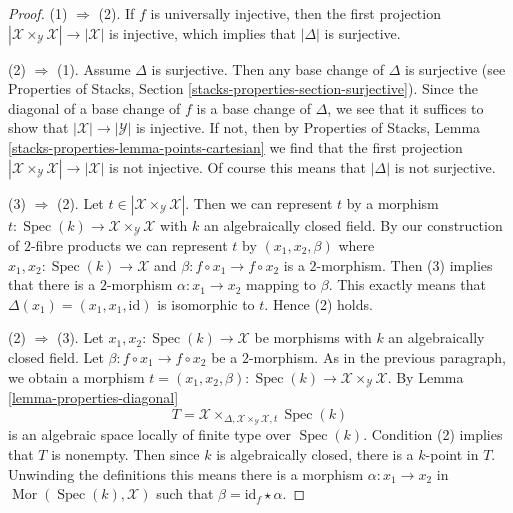 \documentclass[10pt,a4paper]{amsart}
\theoremstyle{plain}
\theoremstyle{definition}
\theoremstyle{remark}
\numberwithin{equation}{subsection}
\def\Spec{\mathop{\mathrm{Spec}}}
\def\Mor{\mathop{\mathrm{Mor}}\nolimits}
\begin{document}
\begin{proof}
(1) $\Rightarrow$ (2). If $f$ is universally injective, then the
first projection
$|\mathcal{X} \times_\mathcal{Y} \mathcal{X}| \to |\mathcal{X}|$
is injective, which implies that $|\Delta|$ is surjective.

\medskip\noindent
(2) $\Rightarrow$ (1). Assume $\Delta$ is surjective. Then any base change
of $\Delta$ is surjective (see Properties of Stacks, Section
\ref{stacks-properties-section-surjective}).
Since the diagonal of a base change
of $f$ is a base change of $\Delta$, we see that it suffices
to show that $|\mathcal{X}| \to |\mathcal{Y}|$ is injective.
If not, then by Properties of Stacks, Lemma
\ref{stacks-properties-lemma-points-cartesian}
we find that the first projection
$|\mathcal{X} \times_\mathcal{Y} \mathcal{X}| \to |\mathcal{X}|$
is not injective. Of course this means that $|\Delta|$ is not
surjective.

\medskip\noindent
(3) $\Rightarrow$ (2). Let
$t \in |\mathcal{X} \times_\mathcal{Y} \mathcal{X}|$.
Then we can represent $t$ by a morphism
$t : \Spec(k) \to \mathcal{X} \times_\mathcal{Y} \mathcal{X}$
with $k$ an algebraically closed field.
By our construction of $2$-fibre products we can represent
$t$ by $(x_1, x_2, \beta)$ where $x_1, x_2 : \Spec(k) \to \mathcal{X}$
and $\beta : f \circ x_1 \to f \circ x_2$ is a $2$-morphism.
Then (3) implies that there is a $2$-morphism
$\alpha : x_1 \to x_2$ mapping to $\beta$.
This exactly means that $\Delta(x_1) = (x_1, x_1, \text{id})$
is isomorphic to $t$. Hence (2) holds.

\medskip\noindent
(2) $\Rightarrow$ (3). Let $x_1, x_2 : \Spec(k) \to \mathcal{X}$
be morphisms with $k$ an algebraically closed field. Let
$\beta : f \circ x_1 \to f \circ x_2$ be a $2$-morphism.
As in the previous paragraph, we obtain a morphism
$t = (x_1, x_2, \beta) :
\Spec(k) \to \mathcal{X} \times_\mathcal{Y} \mathcal{X}$.
By Lemma \ref{lemma-properties-diagonal}
$$
T = \mathcal{X}
\times_{\Delta, \mathcal{X} \times_\mathcal{Y} \mathcal{X}, t} \Spec(k)
$$
is an algebraic space locally of finite type over $\Spec(k)$.
Condition (2) implies that $T$ is nonempty. Then since $k$ is
algebraically closed, there is a $k$-point in $T$.
Unwinding the definitions this means there is a morphism
$\alpha : x_1 \to x_2$ in $\Mor(\Spec(k), \mathcal{X})$
such that $\beta = \text{id}_f \star \alpha$.
\end{proof}
\end{document}
